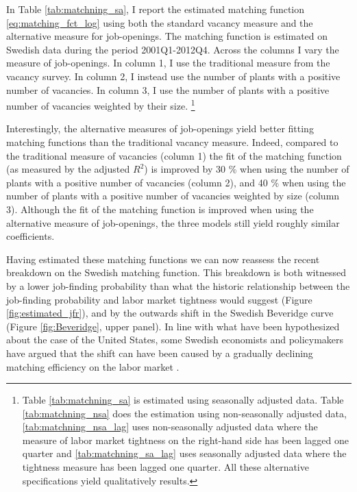 In Table \ref{tab:matchning_sa}, I report the estimated matching function \eqref{eq:matching_fct_log} using both the standard vacancy measure and the alternative measure for job-openings. The matching function is estimated on Swedish data during the period 2001Q1-2012Q4. Across the columns I vary the measure of job-openings. In column 1, I use the traditional measure from the vacancy survey. In column 2, I instead use the number of plants with a positive number of vacancies. In column 3, I use the number of plants with a positive number of vacancies weighted by their size. \footnote{Table \ref{tab:matchning_sa} is estimated using seasonally adjusted data. Table \ref{tab:matchning_nsa} does the estimation using non-seasonally adjusted data, \ref{tab:matchning_nsa_lag} uses non-seasonally adjusted data where the measure of labor market tightness on the right-hand side has been lagged one quarter and \ref{tab:matchning_sa_lag} uses seasonally adjusted data where the tightness measure has been lagged one quarter. All these alternative specifications yield qualitatively results.}

Interestingly, the alternative measures of job-openings yield better fitting matching functions than the traditional vacancy measure. Indeed, compared to the traditional measure of vacancies (column 1) the fit of the matching function (as measured by the adjusted $R^2$) is improved by 30 \% when using the number of plants with a positive number of vacancies (column 2), and 40 \% when using the number of plants with a positive number of vacancies weighted by size (column 3). Although the fit of the matching function is improved when using the alternative measure of job-openings, the three models still yield roughly similar coefficients. 

Having estimated these matching functions we can now reassess the recent breakdown on the Swedish matching function. This breakdown is both witnessed by a lower job-finding probability than what the historic relationship between the job-finding probability and labor market tightness would suggest (Figure \ref{fig:estimated_jfr}), and by the outwards shift in the Swedish Beveridge curve (Figure \ref{fig:Beveridge}, upper panel). In line with what have been hypothesized about the case of the United States, some Swedish economists and policymakers have argued that the shift can have been caused by a gradually declining matching efficiency on the labor market \citep{Riksbank2012, Hakanson2014}.  

